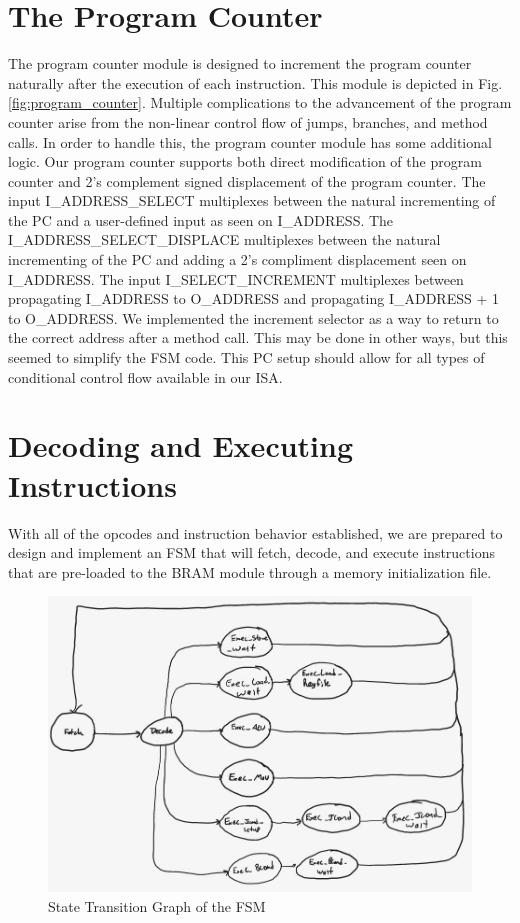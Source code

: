 \documentclass[conference]{IEEEtran}
\begin{document}
\section{The Program Counter}
The program counter module is designed to increment the program counter naturally after the execution of each instruction. This module is depicted in Fig. \ref{fig:program_counter}. Multiple complications to the advancement of the program counter arise from the non-linear control flow of jumps, branches, and method calls. In order to handle this, the program counter module has some additional logic. Our program counter supports both direct modification of the program counter and 2's complement signed displacement of the program counter. The input I\_ADDRESS\_SELECT multiplexes between the natural incrementing of the PC and a user-defined input as seen on I\_ADDRESS. The I\_ADDRESS\_SELECT\_DISPLACE multiplexes between the natural incrementing of the PC and adding a 2's compliment displacement seen on I\_ADDRESS. The input I\_SELECT\_INCREMENT multiplexes between propagating I\_ADDRESS to O\_ADDRESS and propagating I\_ADDRESS + 1 to O\_ADDRESS. We implemented the increment selector as a way to return to the correct address after a method call. This may be done in other ways, but this seemed to simplify the FSM code. This PC setup should allow for all types of conditional control flow available in our ISA.

\section{Decoding and Executing Instructions}
With all of the opcodes and instruction behavior established, we are prepared to design and implement an FSM that will fetch, decode, and execute instructions that are pre-loaded to the BRAM module through a memory initialization file. 

\begin{figure}[ht]
    \centering
    \includegraphics[scale=0.45]{resources/figures/fsm_stg.jpg}
    \caption{State Transition Graph of the FSM}
    \label{fig:fsm_stg}
\end{figure}
\end{document}
